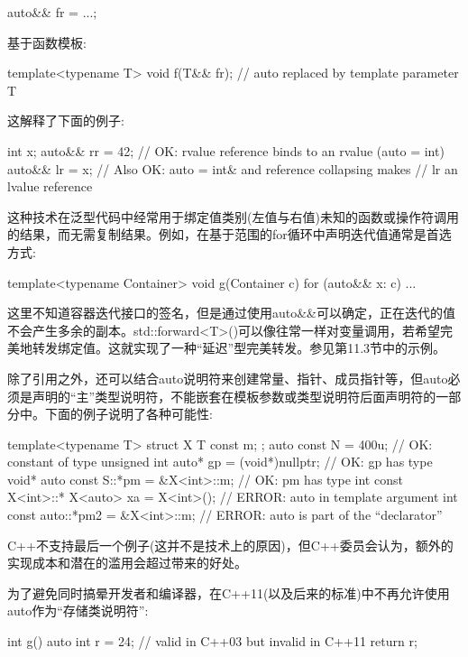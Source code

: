 \begin{cpp}
auto&& fr = ...;
\end{cpp}

基于函数模板:

\begin{cpp}
template<typename T> void f(T&& fr); // auto replaced by template parameter T
\end{cpp}

这解释了下面的例子:

\begin{cpp}
int x;
auto&& rr = 42; // OK: rvalue reference binds to an rvalue (auto = int)
auto&& lr = x; // Also OK: auto = int& and reference collapsing makes
// lr an lvalue reference
\end{cpp}

这种技术在泛型代码中经常用于绑定值类别(左值与右值)未知的函数或操作符调用的结果，而无需复制结果。例如，在基于范围的for循环中声明迭代值通常是首选方式:

\begin{cpp}
template<typename Container> void g(Container c) {
	for (auto&& x: c) {
		...
	}
}
\end{cpp}

这里不知道容器迭代接口的签名，但是通过使用auto\&\&可以确定，正在迭代的值不会产生多余的副本。std::forward<T>()可以像往常一样对变量调用，若希望完美地转发绑定值。这就实现了一种“延迟”型完美转发。参见第11.3节中的示例。

除了引用之外，还可以结合auto说明符来创建常量、指针、成员指针等，但auto必须是声明的“主”类型说明符，不能嵌套在模板参数或类型说明符后面声明符的一部分中。下面的例子说明了各种可能性:

\begin{cpp}
template<typename T> struct X { T const m; };
auto const N = 400u; // OK: constant of type unsigned int
auto* gp = (void*)nullptr; // OK: gp has type void*
auto const S::*pm = &X<int>::m; // OK: pm has type int const X<int>::*
X<auto> xa = X<int>(); // ERROR: auto in template argument
int const auto::*pm2 = &X<int>::m; // ERROR: auto is part of the “declarator”
\end{cpp}

C++不支持最后一个例子(这并不是技术上的原因)，但C++委员会认为，额外的实现成本和潜在的滥用会超过带来的好处。

为了避免同时搞晕开发者和编译器，在C++11(以及后来的标准)中不再允许使用auto作为“存储类说明符”:

\begin{cpp}
int g() {
	auto int r = 24; // valid in C++03 but invalid in C++11
	return r;
}
\end{cpp}

